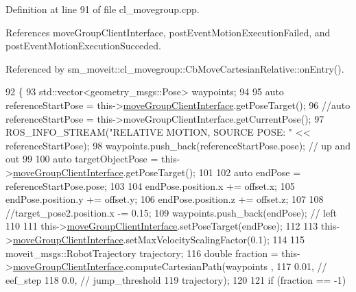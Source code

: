 Definition at line 91 of file cl\+\_\+movegroup.\+cpp.



References move\+Group\+Client\+Interface, post\+Event\+Motion\+Execution\+Failed, and post\+Event\+Motion\+Execution\+Succeded.



Referenced by sm\+\_\+moveit\+::cl\+\_\+movegroup\+::\+Cb\+Move\+Cartesian\+Relative\+::on\+Entry().


\begin{DoxyCode}
92 \{
93     std::vector<geometry\_msgs::Pose> waypoints;
94 
95     \textcolor{keyword}{auto} referenceStartPose = this->\hyperlink{classsm__moveit_1_1cl__movegroup_1_1ClMoveGroup_a23acf6883455566dbab30e4367c2144d}{moveGroupClientInterface}.getPoseTarget();
96     \textcolor{comment}{//auto referenceStartPose = this->moveGroupClientInterface.getCurrentPose();}
97     ROS\_INFO\_STREAM(\textcolor{stringliteral}{"RELATIVE MOTION, SOURCE POSE: "} << referenceStartPose);
98     waypoints.push\_back(referenceStartPose.pose); \textcolor{comment}{// up and out}
99 
100     \textcolor{keyword}{auto} targetObjectPose = this->\hyperlink{classsm__moveit_1_1cl__movegroup_1_1ClMoveGroup_a23acf6883455566dbab30e4367c2144d}{moveGroupClientInterface}.getPoseTarget();
101 
102     \textcolor{keyword}{auto} endPose = referenceStartPose.pose;
103 
104     endPose.position.x += offset.x;
105     endPose.position.y += offset.y;
106     endPose.position.z += offset.z;
107 
108     \textcolor{comment}{//target\_pose2.position.x -= 0.15;}
109     waypoints.push\_back(endPose); \textcolor{comment}{// left}
110 
111     this->\hyperlink{classsm__moveit_1_1cl__movegroup_1_1ClMoveGroup_a23acf6883455566dbab30e4367c2144d}{moveGroupClientInterface}.setPoseTarget(endPose);
112 
113     this->\hyperlink{classsm__moveit_1_1cl__movegroup_1_1ClMoveGroup_a23acf6883455566dbab30e4367c2144d}{moveGroupClientInterface}.setMaxVelocityScalingFactor(0.1);
114 
115     moveit\_msgs::RobotTrajectory trajectory;
116     \textcolor{keywordtype}{double} fraction = this->\hyperlink{classsm__moveit_1_1cl__movegroup_1_1ClMoveGroup_a23acf6883455566dbab30e4367c2144d}{moveGroupClientInterface}.computeCartesianPath(waypoints
      ,
117                                                                           0.01, \textcolor{comment}{// eef\_step}
118                                                                           0.0,  \textcolor{comment}{// jump\_threshold}
119                                                                           trajectory);
120 
121     \textcolor{keywordflow}{if} (fraction == -1)

\end{DoxyCode}
